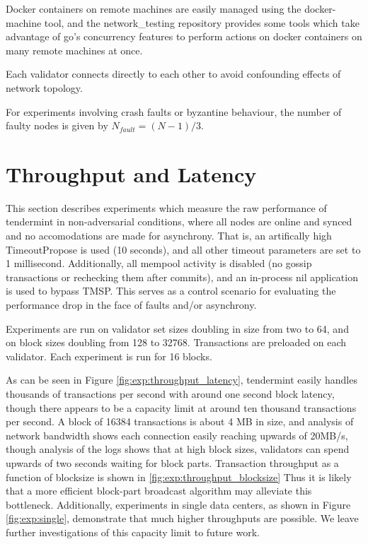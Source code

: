 Docker containers on remote machines are easily managed using the docker-machine tool, 
and the network\_testing repository provides some tools which take advantage of go's concurrency features
to perform actions on docker containers on many remote machines at once.

Each validator connects directly to each other to avoid confounding effects of network topology.

For experiments involving crash faults or byzantine behaviour, the number of faulty nodes is given by $N_{fault} = (N-1)/3$.

\section{Throughput and Latency}

This section describes experiments which measure the raw performance of tendermint in non-adversarial conditions,
where all nodes are online and synced and no accomodations are made for asynchrony.
That is, an artifically high TimeoutPropose is used (10 seconds), and all other timeout parameters are set to 1 millisecond.
Additionally, all mempool activity is disabled (no gossip transactions or rechecking them after commits),
and an in-process nil application is used to bypass TMSP.
This serves as a control scenario for evaluating the performance drop in the face of faults and/or asynchrony.

Experiments are run on validator set sizes doubling in size from two to 64, and on block sizes doubling from 128 to 32768.
Transactions are preloaded on each validator. Each experiment is run for 16 blocks. 

As can be seen in Figure \ref{fig:exp:throughput_latency}, 
tendermint easily handles thousands of transactions per second with around one second block latency,
though there appears to be a capacity limit at around ten thousand transactions per second.
A block of 16384 transactions is about 4 MB in size, and analysis of network bandwidth shows each connection
easily reaching upwards of 20MB/s, though analysis of the logs shows that at high block sizes, 
validators can spend upwards of two seconds waiting for block parts.
Transaction throughput as a function of blocksize is shown in \ref{fig:exp:throughput_blocksize}
Thus it is likely that a more efficient block-part broadcast algorithm may alleviate this bottleneck.
Additionally, experiments in single data centers, as shown in Figure \ref{fig:exp:single},
demonstrate that much higher throughputs are possible. We leave further investigations of this capacity limit to future work.


